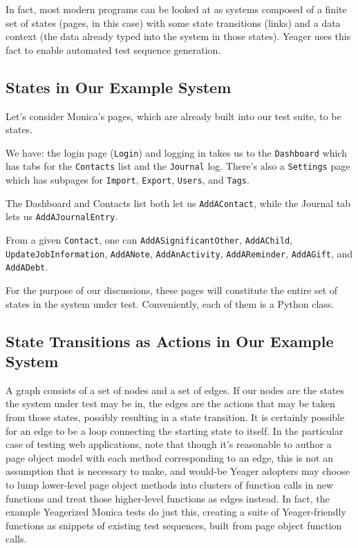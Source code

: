 In fact, most modern programs can be looked at as systems composed of a finite set of states (pages, in this case) with some state transitions (links) and a data context (the data already typed into the system in those states). Yeager uses this fact to enable automated test sequence generation.

\subsection{States in Our Example System}
Let's consider Monica's pages, which are already built into our test suite, to be states.

We have: the login page (\texttt{Login}) and logging in takes us to the \texttt{Dashboard} which has tabs for the \texttt{Contacts} list and the \texttt{Journal} log. There's also a \texttt{Settings} page which has subpages for \texttt{Import}, \texttt{Export}, \texttt{Users}, and \texttt{Tags}.

The Dashboard and Contacts list both let us \texttt{AddAContact}, while the Journal tab lets us \texttt{AddAJournalEntry}.

From a given \texttt{Contact}, one can \texttt{AddASignificantOther}, \texttt{AddAChild}, \\\texttt{UpdateJobInformation}, \texttt{AddANote}, \texttt{AddAnActivity}, \texttt{AddAReminder}, \texttt{AddAGift}, and \texttt{AddADebt}.

For the purpose of our discussions, these pages will constitute the entire set of states in the system under test. Conveniently, each of them is a Python class.

\subsection{State Transitions as Actions in Our Example System}
A graph consists of a set of nodes and a set of edges. If our nodes are the states the system under test may be in, the edges are the actions that may be taken from those states, possibly resulting in a state transition. It is certainly possible for an edge to be a loop connecting the starting state to itself. In the particular case of testing web applications, note that though it's reasonable to author a page object model with each method corresponding to an edge, this is not an assumption that is necessary to make, and would-be Yeager adopters may choose to lump lower-level page object methods into clusters of function calls in new functions and treat those higher-level functions as edges instead. In fact, the example Yeagerized Monica tests do just this, creating a suite of Yeager-friendly functions as snippets of existing test sequences, built from page object function calls.


